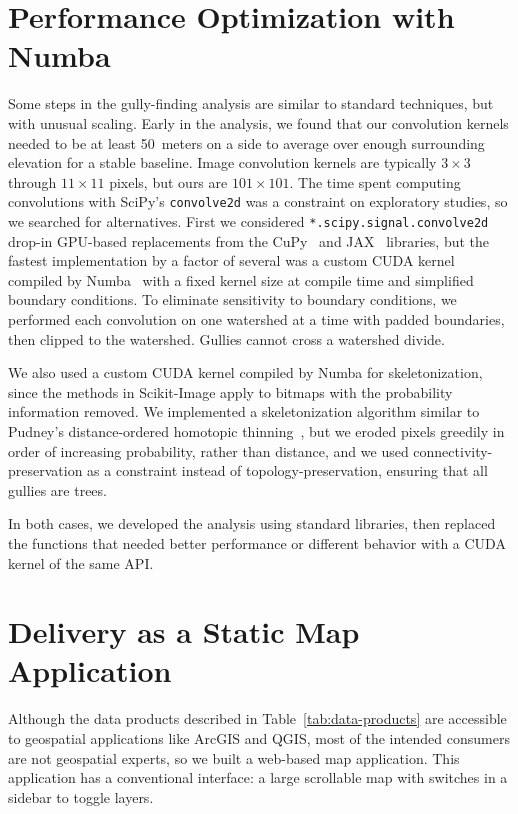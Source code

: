 \section{Performance Optimization with Numba}\label{sec:numba}

Some steps in the gully-finding analysis are similar to standard techniques, but with unusual scaling. Early in the analysis, we found that our convolution kernels needed to be at least 50~meters on a side to average over enough surrounding elevation for a stable baseline. Image convolution kernels are typically $3\times 3$ through $11\times 11$ pixels, but ours are $101\times 101$. The time spent computing convolutions with SciPy's \texttt{convolve2d} was a constraint on exploratory studies, so we searched for alternatives. First we considered \texttt{*.scipy.signal.convolve2d} drop-in GPU-based replacements from the CuPy~\citep{cupy} and JAX~\citep{jax} libraries, but the fastest implementation by a factor of several was a custom CUDA kernel compiled by Numba~\citep{numba} with a fixed kernel size at compile time and simplified boundary conditions. To eliminate sensitivity to boundary conditions, we performed each convolution on one watershed at a time with padded boundaries, then clipped to the watershed. Gullies cannot cross a watershed divide.

We also used a custom CUDA kernel compiled by Numba for skeletonization, since the methods in Scikit-Image apply to bitmaps with the probability information removed. We implemented a skeletonization algorithm similar to Pudney's distance-ordered homotopic thinning~\citep{PUDNEY1998404}, but we eroded pixels greedily in order of increasing probability, rather than distance, and we used connectivity-preservation as a constraint instead of topology-preservation, ensuring that all gullies are trees.

In both cases, we developed the analysis using standard libraries, then replaced the functions that needed better performance or different behavior with a CUDA kernel of the same API.

\section{Delivery as a Static Map Application}

Although the data products described in Table~\ref{tab:data-products} are accessible to geospatial applications like ArcGIS and QGIS, most of the intended consumers are not geospatial experts, so we built a web-based map application. This application has a conventional interface: a large scrollable map with switches in a sidebar to toggle layers.

